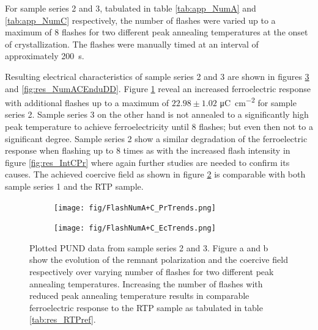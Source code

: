 \documentclass[11pt,twoside]{eitExjobb}
\begin{document}
For sample series 2 and 3, tabulated in table \ref{tab:app_NumA} and
\ref{tab:app_NumC} respectively, the number of flashes were varied up to a
maximum of 8 flashes for two different peak annealing temperatures at the onset
of crystallization. The flashes were manually timed at an interval of
approximately \SI{200}{\second}.

Resulting electrical characteristics of sample series 2 and 3 are shown in
figures \ref{fig:res_NumACPUND} and \ref{fig:res_NumACEnduDD}. Figure
\ref{fig:res_NumACPr} reveal an increased ferroelectric response with
additional flashes up to a maximum of $22.98 \pm 1.02$
\si{\micro\coulomb\per\centi\meter\squared} for sample series 2. Sample series 3
on the other hand is not annealed to a significantly high peak temperature to
achieve ferroelectricity until 8 flashes; but even then not to a significant
degree. Sample series 2 show a similar degradation of the ferroelectric response
when flashing up to 8 times as with the increased flash intensity in figure
\ref{fig:res_IntCPr} where again further studies are needed to confirm its
causes. The achieved coercive field as shown in figure \ref{fig:res_NumACEc}
is comparable with both sample series 1 and the RTP sample.

\begin{figure}[htbp]
    \centering
    \begin{subfigure}{.4\linewidth}
        \texttt{[image: fig/FlashNumA+C\_PrTrends.png]}
        \caption{}\label{fig:res_NumACPr}
    \end{subfigure}
    \begin{subfigure}{.4\linewidth}
        \texttt{[image: fig/FlashNumA+C\_EcTrends.png]}
        \caption{}\label{fig:res_NumACEc}    
    \end{subfigure}
    \caption{Plotted PUND data from sample series 2 and 3. Figure a and b show the
    evolution of the remnant polarization and the coercive field respectively
    over varying number of flashes for two different peak annealing temperatures.
    Increasing the number of flashes with reduced peak annealing temperature
    results in comparable ferroelectric response to the RTP sample as tabulated
    in table \ref{tab:res_RTPref}.}\label{fig:res_NumACPUND}
\end{figure}
\end{document}
